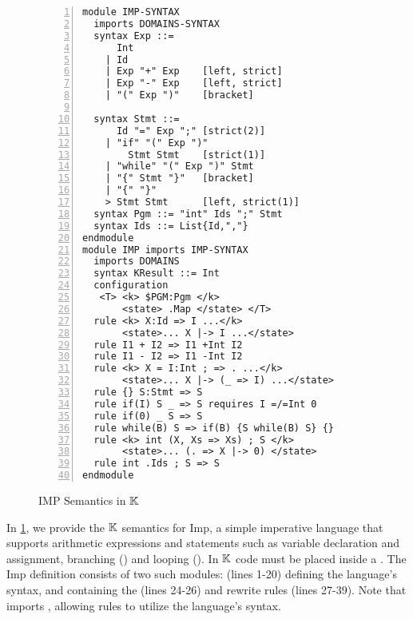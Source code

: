 \begin{figure}[H]
  \centering
  \begin{lstlisting}[style=ksty, language=k,  multicols=2,
  basicstyle=\ttfamily\notsotiny, numbers=left
  ,showspaces=false
  ,xleftmargin=2em]
module IMP-SYNTAX
  imports DOMAINS-SYNTAX
  syntax Exp ::=
      Int
    | Id
    | Exp "+" Exp    [left, strict]
    | Exp "-" Exp    [left, strict]
    | "(" Exp ")"    [bracket]

  syntax Stmt ::=
      Id "=" Exp ";" [strict(2)]
    | "if" "(" Exp ")"
        Stmt Stmt    [strict(1)]
    | "while" "(" Exp ")" Stmt
    | "{" Stmt "}"   [bracket]
    | "{" "}"
    > Stmt Stmt      [left, strict(1)]
  syntax Pgm ::= "int" Ids ";" Stmt
  syntax Ids ::= List{Id,","}
endmodule
module IMP imports IMP-SYNTAX
  imports DOMAINS
  syntax KResult ::= Int
  configuration
   <T> <k> $PGM:Pgm </k>
       <state> .Map </state> </T>
  rule <k> X:Id => I ...</k>
       <state>... X |-> I ...</state>
  rule I1 + I2 => I1 +Int I2
  rule I1 - I2 => I1 -Int I2
  rule <k> X = I:Int ; => . ...</k>
       <state>... X |-> (_ => I) ...</state>
  rule {} S:Stmt => S
  rule if(I) S _ => S requires I =/=Int 0
  rule if(0) _ S => S
  rule while(B) S => if(B) {S while(B) S} {}
  rule <k> int (X, Xs => Xs) ; S </k>
       <state>... (. => X |-> 0) </state>
  rule int .Ids ; S => S
endmodule
\end{lstlisting}
  \caption{IMP Semantics in $\mathbb{K}$}\label{fig:imp-semantics}
\end{figure}

In \figurename{} \ref{fig:imp-semantics}, we provide the $\mathbb{K}$ semantics
for Imp, a simple imperative language that supports arithmetic expressions and
statements such as variable declaration and assignment, branching () and looping ().
In $\mathbb{K}{}$ code must be placed inside a . The Imp definition
consists of two such modules:  (lines 1-20) defining the language's
syntax, and  containing the  (lines 24-26)
and rewrite rules (lines 27-39). Note that  imports
, allowing rules to utilize the language's syntax.


